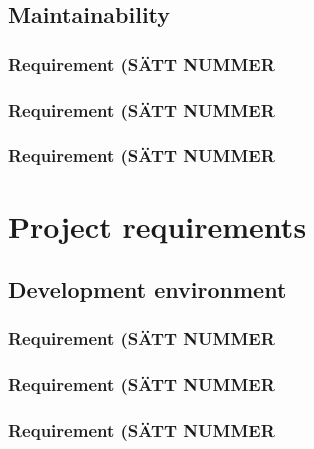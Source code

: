 \documentclass{article}
\begin{document}
\subsection{Maintainability}
\subsubsection{Requirement (SÄTT NUMMER}
\subsubsection{Requirement (SÄTT NUMMER}
\subsubsection{Requirement (SÄTT NUMMER}



\section{Project requirements}
\subsection{Development environment}
\subsubsection{Requirement (SÄTT NUMMER}
\subsubsection{Requirement (SÄTT NUMMER}
\subsubsection{Requirement (SÄTT NUMMER}
\end{document}
